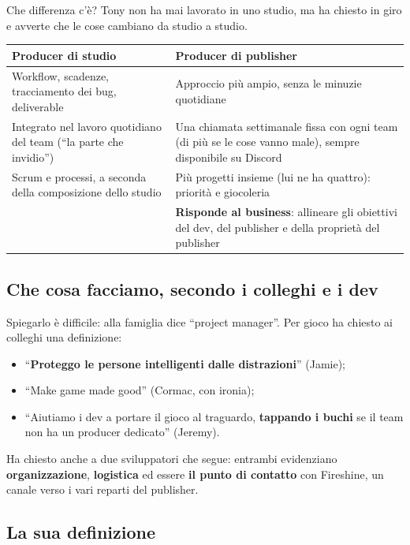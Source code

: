 Che differenza c'è? Tony non ha mai lavorato in uno studio, ma ha chiesto in giro e
avverte che le cose cambiano da studio a studio.
\begin{center}
\begin{tabular}{@{}p{}p{}@{}}
\toprule
\textbf{Producer di studio} & \textbf{Producer di publisher} \\
\midrule
Workflow, scadenze, tracciamento dei bug, deliverable &
Approccio più ampio, senza le minuzie quotidiane \\
Integrato nel lavoro quotidiano del team (``la parte che invidio'') &
Una chiamata settimanale fissa con ogni team (di più se le cose vanno male),
sempre disponibile su Discord \\
Scrum e processi, a seconda della composizione dello studio &
Più progetti insieme (lui ne ha quattro): priorità e giocoleria \\
 & \textbf{Risponde al business}: allineare gli obiettivi del dev, del publisher
e della proprietà del publisher \\
\bottomrule
\end{tabular}
\end{center}

\subsection{Che cosa facciamo, secondo i colleghi e i dev}

Spiegarlo è difficile: alla famiglia dice ``project manager''. Per gioco ha chiesto
ai colleghi una definizione:
\begin{itemize}
  \item ``\textbf{Proteggo le persone intelligenti dalle distrazioni}'' (Jamie);
  \item ``Make game made good'' (Cormac, con ironia);
  \item ``Aiutiamo i dev a portare il gioco al traguardo, \textbf{tappando i buchi}
        se il team non ha un producer dedicato'' (Jeremy).
\end{itemize}
Ha chiesto anche a due sviluppatori che segue: entrambi evidenziano
\textbf{organizzazione}, \textbf{logistica} ed essere \textbf{il punto di
contatto} con Fireshine, un canale verso i vari reparti del publisher.

\subsection{La sua definizione}

